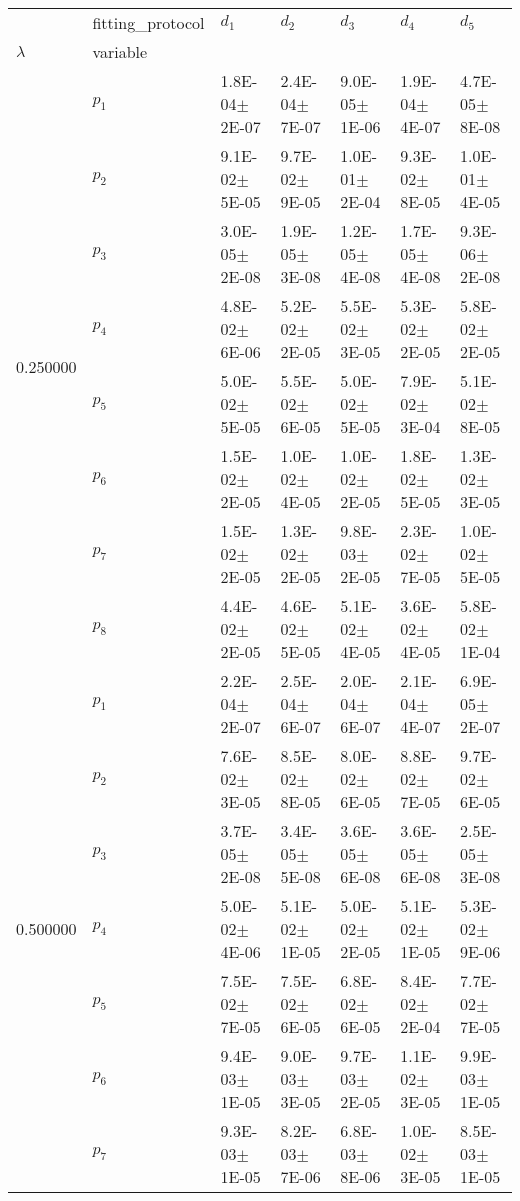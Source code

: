 \begin{tabular}{lllllll}
 & fitting_protocol & $d_1$ & $d_2$ & $d_3$ & $d_4$ & $d_5$ \\
$\lambda$ & variable &  &  &  &  &  \\
\multirow[c]{8}{*}{0.250000} & $p_1$ & 1.8E-04\(\pm\)2E-07 & 2.4E-04\(\pm\)7E-07 & 9.0E-05\(\pm\)1E-06 & 1.9E-04\(\pm\)4E-07 & 4.7E-05\(\pm\)8E-08 \\
 & $p_2$ & 9.1E-02\(\pm\)5E-05 & 9.7E-02\(\pm\)9E-05 & 1.0E-01\(\pm\)2E-04 & 9.3E-02\(\pm\)8E-05 & 1.0E-01\(\pm\)4E-05 \\
 & $p_3$ & 3.0E-05\(\pm\)2E-08 & 1.9E-05\(\pm\)3E-08 & 1.2E-05\(\pm\)4E-08 & 1.7E-05\(\pm\)4E-08 & 9.3E-06\(\pm\)2E-08 \\
 & $p_4$ & 4.8E-02\(\pm\)6E-06 & 5.2E-02\(\pm\)2E-05 & 5.5E-02\(\pm\)3E-05 & 5.3E-02\(\pm\)2E-05 & 5.8E-02\(\pm\)2E-05 \\
 & $p_5$ & 5.0E-02\(\pm\)5E-05 & 5.5E-02\(\pm\)6E-05 & 5.0E-02\(\pm\)5E-05 & 7.9E-02\(\pm\)3E-04 & 5.1E-02\(\pm\)8E-05 \\
 & $p_6$ & 1.5E-02\(\pm\)2E-05 & 1.0E-02\(\pm\)4E-05 & 1.0E-02\(\pm\)2E-05 & 1.8E-02\(\pm\)5E-05 & 1.3E-02\(\pm\)3E-05 \\
 & $p_7$ & 1.5E-02\(\pm\)2E-05 & 1.3E-02\(\pm\)2E-05 & 9.8E-03\(\pm\)2E-05 & 2.3E-02\(\pm\)7E-05 & 1.0E-02\(\pm\)5E-05 \\
 & $p_8$ & 4.4E-02\(\pm\)2E-05 & 4.6E-02\(\pm\)5E-05 & 5.1E-02\(\pm\)4E-05 & 3.6E-02\(\pm\)4E-05 & 5.8E-02\(\pm\)1E-04 \\
\multirow[c]{8}{*}{0.500000} & $p_1$ & 2.2E-04\(\pm\)2E-07 & 2.5E-04\(\pm\)6E-07 & 2.0E-04\(\pm\)6E-07 & 2.1E-04\(\pm\)4E-07 & 6.9E-05\(\pm\)2E-07 \\
 & $p_2$ & 7.6E-02\(\pm\)3E-05 & 8.5E-02\(\pm\)8E-05 & 8.0E-02\(\pm\)6E-05 & 8.8E-02\(\pm\)7E-05 & 9.7E-02\(\pm\)6E-05 \\
 & $p_3$ & 3.7E-05\(\pm\)2E-08 & 3.4E-05\(\pm\)5E-08 & 3.6E-05\(\pm\)6E-08 & 3.6E-05\(\pm\)6E-08 & 2.5E-05\(\pm\)3E-08 \\
 & $p_4$ & 5.0E-02\(\pm\)4E-06 & 5.1E-02\(\pm\)1E-05 & 5.0E-02\(\pm\)2E-05 & 5.1E-02\(\pm\)1E-05 & 5.3E-02\(\pm\)9E-06 \\
 & $p_5$ & 7.5E-02\(\pm\)7E-05 & 7.5E-02\(\pm\)6E-05 & 6.8E-02\(\pm\)6E-05 & 8.4E-02\(\pm\)2E-04 & 7.7E-02\(\pm\)7E-05 \\
 & $p_6$ & 9.4E-03\(\pm\)1E-05 & 9.0E-03\(\pm\)3E-05 & 9.7E-03\(\pm\)2E-05 & 1.1E-02\(\pm\)3E-05 & 9.9E-03\(\pm\)1E-05 \\
 & $p_7$ & 9.3E-03\(\pm\)1E-05 & 8.2E-03\(\pm\)7E-06 & 6.8E-03\(\pm\)8E-06 & 1.0E-02\(\pm\)3E-05 & 8.5E-03\(\pm\)1E-05 \\

\end{tabular}
